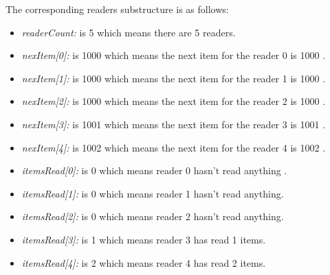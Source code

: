 The corresponding readers substructure is as follows:
\begin{itemize}
	\item{\emph{readerCount:} is 5 which means there are 5 readers.}
	  \item{\emph{nexItem[0]:} is 1000 which means the next item for the reader 0 is 1000 .}
	   \item{\emph{nexItem[1]:} is 1000 which means the next item for the reader 1 is 1000 .}
	    \item{\emph{nexItem[2]:} is 1000 which means the next item for the reader 2 is 1000 .}
	     \item{\emph{nexItem[3]:} is 1001 which means the next item for the reader 3 is 1001 .}
	      \item{\emph{nexItem[4]:} is 1002 which means the next item for the reader 4 is 1002 .}
	      
	     	  \item{\emph{itemsRead[0]:} is 0 which means reader 0 hasn't read anything .}
	   \item{\emph{itemsRead[1]:} is 0 which means reader 1 hasn't read anything.}
	    \item{\emph{itemsRead[2]:} is 0 which means reader 2 hasn't read anything.}
	     \item{\emph{itemsRead[3]:} is 1 which means reader 3 has read 1 items.}
	      \item{\emph{itemsRead[4]:} is 2 which means reader 4 has read 2 items.} 
\end{itemize} 


